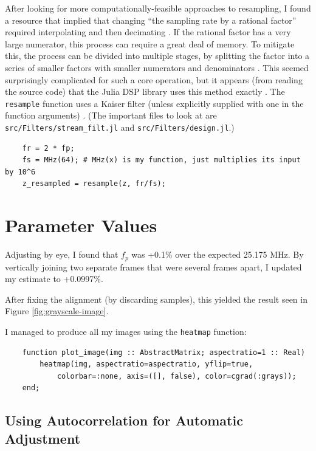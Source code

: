 \documentclass{article}
\newcommand*{\mono}[1]{\texttt{#1}}
\newcommand*{\code}[1]{\texttt{#1}}
\begin{document}
After looking for more computationally-feasible approaches to resampling, I found a resource that implied that changing ``the sampling rate by a rational factor'' required interpolating and then decimating \cite{dspguru-resampling}. If the rational factor has a very large numerator, this process can require a great deal of memory. To mitigate this, the process can be divided into multiple stages, by splitting the factor into a series of smaller factors with smaller numerators and denominators \cite{dspguru-resampling}. This seemed surprisingly complicated for such a core operation, but it appears (from reading the source code) that the Julia DSP library uses this method exactly \cite{dsp-julia-github}. The \code{resample} function uses a Kaiser filter (unless explicitly supplied with one in the function arguments) \cite{dsp-julia-github}. (The important files to look at are \code{src/Filters/stream_filt.jl} and \mono{src/Filters/design.jl}.)

\begin{verbatim}
    fr = 2 * fp;
    fs = MHz(64); # MHz(x) is my function, just multiplies its input by 10^6
    z_resampled = resample(z, fr/fs);
\end{verbatim}

\section*{Parameter Values}

Adjusting by eye, I found that $f_p$ was +0.1\% over the expected 25.175 MHz. By vertically joining two separate frames that were several frames apart, I updated my estimate to +0.0997\%.

After fixing the alignment (by discarding samples), this yielded the result seen in Figure \ref{fig:grayscale-image}.

I managed to produce all my images using the \code{heatmap} function:
\begin{verbatim}
    function plot_image(img :: AbstractMatrix; aspectratio=1 :: Real)
        heatmap(img, aspectratio=aspectratio, yflip=true,
            colorbar=:none, axis=([], false), color=cgrad(:grays));
    end;
\end{verbatim}

\subsection*{Using Autocorrelation for Automatic Adjustment}
\end{document}
